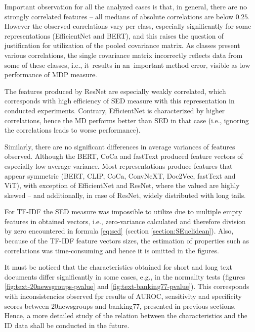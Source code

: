 Important observation for all the analyzed cases is that, in general, there are no strongly correlated features – all medians of absolute correlations are below $0.25$. However the observed correlations vary per class, especially significantly for some representations (EfficientNet and BERT), and this raises the question of justification for utilization of the pooled covariance matrix. As classes present various correlations, the single covariance matrix incorrectly reflects data from some of these classes, i.e., it~results in an~important method error, visible as low performance of MDP measure.

The features produced by ResNet are especially weakly correlated, which corresponds with high efficiency of SED measure with this representation in conducted experiments. Contrary, EfficientNet is characterized by higher correlations, hence the MD performs better than SED in that case (i.e., ignoring the correlations leads to worse performance).

Similarly, there are no significant differences in average variances of features observed. Although the BERT, CoCa and fastText produced feature vectors of especially low average variance. Most representations produce features that appear symmetric (BERT, CLIP, CoCa, ConvNeXT, Doc2Vec, fastText and ViT), with exception of EfficientNet and ResNet, where the valued are highly skewed – and additionally, in case of ResNet, widely distributed with long tails.

For TF-IDF the SED measure was impossible to utilize due to multiple empty features in obtained vectors, i.e., zero-variance calculated and therefore division by zero encountered in formula \ref{eq:sed} (section \ref{section:SEuclidean}). Also, because of the TF-IDF feature vectors sizes, the estimation of properties such as correlations was time-consuming and hence it is omitted in the figures.

It must be noticed that the characteristics obtained for short and long text documents differ significantly in some cases, e.g., in the normality tests (figures \ref{fig:text-20newsgroups-pvalue} and \ref{fig:text-banking77-pvalue}). This corresponds with inconsistencies observed fpr results of AUROC, sensitivity and specificity scores between 20newsgroups and banking77, presented in previous sections. Hence, a more detailed study of the relation between the characteristics and the ID data shall be conducted in the future.

